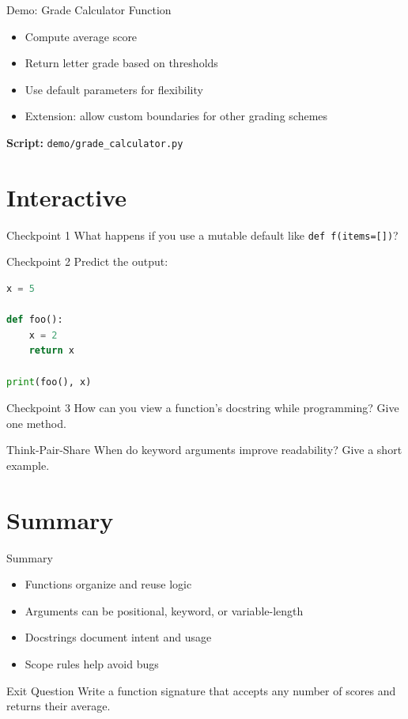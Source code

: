 \documentclass{beamer}
\begin{document}
\begin{frame}[fragile]{Demo: Grade Calculator Function}
  \begin{itemize}[<+->]
    \item Compute average score
    \item Return letter grade based on thresholds
    \item Use default parameters for flexibility
    \item Extension: allow custom boundaries for other grading schemes
  \end{itemize}
  \vspace{0.4em}
  \textbf{Script:} \texttt{demo/grade\_calculator.py}
\end{frame}

\section{Interactive}
\label{sec:interactive}

\begin{frame}[fragile]{Checkpoint 1}
  What happens if you use a mutable default like \texttt{def f(items=[])}?
\end{frame}

\begin{frame}[fragile]{Checkpoint 2}
  Predict the output:
  \begin{lstlisting}[language=Python]
x = 5

def foo():
    x = 2
    return x

print(foo(), x)
  \end{lstlisting}
\end{frame}

\begin{frame}[fragile]{Checkpoint 3}
  How can you view a function's docstring while programming?
  Give one method.
\end{frame}

\begin{frame}[fragile]{Think-Pair-Share}
  When do keyword arguments improve readability?
  Give a short example.
\end{frame}

\section{Summary}
\label{sec:summary}

\begin{frame}[fragile]{Summary}
  \begin{itemize}[<+->]
    \item Functions organize and reuse logic
    \item Arguments can be positional, keyword, or variable-length
    \item Docstrings document intent and usage
    \item Scope rules help avoid bugs
  \end{itemize}
\end{frame}

\begin{frame}[fragile]{Exit Question}
  Write a function signature that accepts any number of scores and returns their average.
\end{frame}
\end{document}
